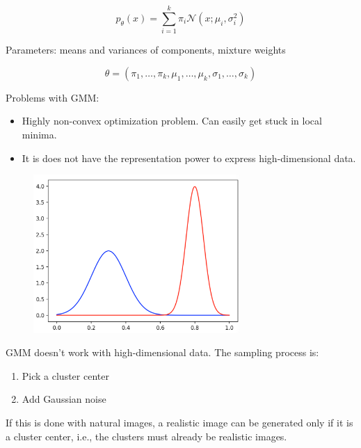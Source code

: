 \documentclass{report}
\begin{document}
\begin{concept}
    $$
    p_{\theta}(x)=\sum_{i=1}^{k} \pi_{i} \mathcal{N}\left(x ; \mu_{i}, \sigma_{i}^{2}\right)
    $$

    Parameters: means and variances of components, mixture weights

    $$
    \theta=\left(\pi_{1}, \ldots, \pi_{k}, \mu_{1}, \ldots, \mu_{k}, \sigma_{1}, \ldots, \sigma_{k}\right)
    $$

    Problems with GMM:

    \begin{itemize}
        \item Highly non-convex optimization problem. Can easily get stuck in local minima.
        \item It is does not have the representation power to express high-dimensional data.
    \end{itemize}

    \begin{figure}[H]
        \centering
        \includegraphics[width=0.7\textwidth]{.././assets/10.1.png}
    \end{figure}

    \par\noindent\textcolor{gray}{\hdashrule{\textwidth}{0.4pt}{1pt 2pt}}

    GMM doesn't work with high-dimensional data. The sampling process is:

    \begin{enumerate}
        \item Pick a cluster center
        \item Add Gaussian noise
    \end{enumerate}

    If this is done with natural images, a realistic image can be generated only if it is a cluster center, i.e., the clusters must already be realistic images.


\end{concept}
\end{document}
